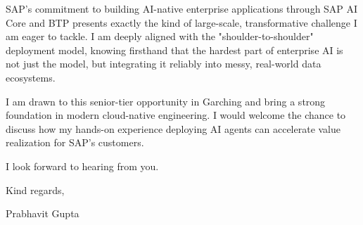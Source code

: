 \documentclass[11pt,a4paper]{article}
\begin{document}
\noindent SAP's commitment to building AI-native enterprise applications through SAP AI Core and BTP presents exactly the kind of large-scale, transformative challenge I am eager to tackle. I am deeply aligned with the "shoulder-to-shoulder" deployment model, knowing firsthand that the hardest part of enterprise AI is not just the model, but integrating it reliably into messy, real-world data ecosystems.

\noindent I am drawn to this senior-tier opportunity in Garching and bring a strong foundation in modern cloud-native engineering. I would welcome the chance to discuss how my hands-on experience deploying AI agents can accelerate value realization for SAP's customers.

\noindent I look forward to hearing from you.

\vspace{10pt}

\noindent Kind regards,

\vspace{10pt}

\noindent Prabhavit Gupta
\end{document}
